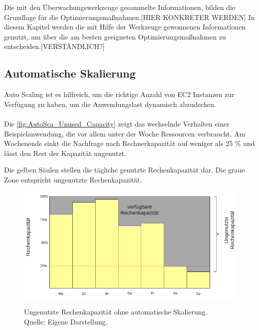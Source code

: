 
Die mit den Überwachungswerkzeuge gesammelte Informationen, bilden die Grundlage für die Optimierungsmaßnahmen.[HIER KONKRETER WERDEN]
In diesem Kapitel werden die mit Hilfe der Werkzeuge gewonnenen Informationen genutzt, um über die am besten geeigneten Optimierungsmaßnahmen zu entscheiden.[VERSTÄNDLICH?]

\subsection{Automatische Skalierung}
Auto Scaling ist es hilfreich, um die richtige Anzahl von EC2 Instanzen zur Verfügung zu haben, um die Anwendungslast dynamisch abzudecken.
\\\\

Die \autoref{fig:AutoSca_Unused_Capacity} zeigt das wechselnde Verhalten einer Beispielanwendung, die vor allem unter der Woche Ressourcen verbraucht. Am Wochenende sinkt die Nachfrage nach Rechnerkapazität auf weniger als 25 \% und lässt den Rest der Kapazität ungenutzt. 

Die gelben Säulen stellen die tägliche genutzte Rechenkapazität dar.
Die graue Zone entspricht ungenutzte Rechenkapazität. 

\begin{figure}[h]
    \centering
    \includegraphics[scale=0.5]{sources/AutoCap Unused Capacity}
    \caption[Ungenutzte Rechenkapazität ohne automatische Skalierung]{}
    \label{fig:AutoSca_Unused_Capacity} Ungenutzte Rechenkapazität ohne automatische Skalierung. \\
    Quelle: Eigene Darstellung. 
  \end{figure}

